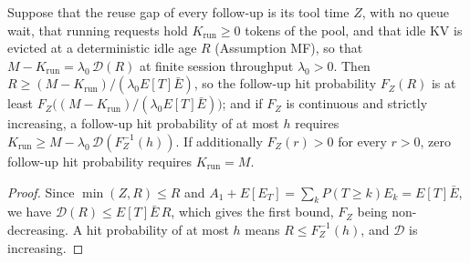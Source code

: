 \begin{proposition}\label{prop:E}
Suppose that the reuse gap of every follow-up is its tool time $Z$, with no queue wait, that running requests hold $K_{\mathrm{run}}\ge0$ tokens of the pool, and that idle KV is evicted at a deterministic idle age $R$ (Assumption MF), so that $M-K_{\mathrm{run}}=\lambda_0\,\mathcal D(R)$ at finite session throughput $\lambda_0>0$. Then $R\ge(M-K_{\mathrm{run}})/(\lambda_0E[T]\bar E)$, so the follow-up hit probability $F_Z(R)$ is at least $F_Z\big((M-K_{\mathrm{run}})/(\lambda_0E[T]\bar E)\big)$; and if $F_Z$ is continuous and strictly increasing, a follow-up hit probability of at most $h$ requires $K_{\mathrm{run}}\ge M-\lambda_0\,\mathcal D(F_Z^{-1}(h))$. If additionally $F_Z(r)>0$ for every $r>0$, zero follow-up hit probability requires $K_{\mathrm{run}}=M$.
\end{proposition}
\begin{proof}
Since $\min(Z,R)\le R$ and $A_1+E[E_T]=\sum_kP(T\ge k)E_k=E[T]\bar E$, we have $\mathcal D(R)\le E[T]\bar E\,R$, which gives the first bound, $F_Z$ being non-decreasing. A hit probability of at most $h$ means $R\le F_Z^{-1}(h)$, and $\mathcal D$ is increasing.
\end{proof}
